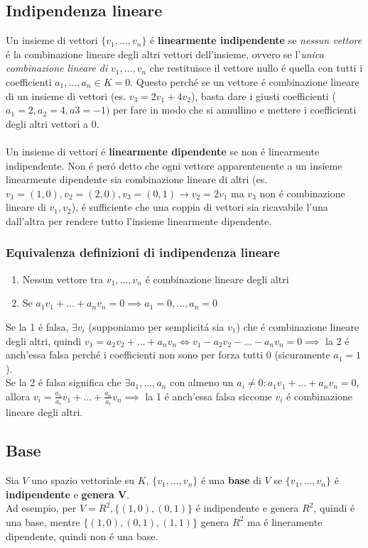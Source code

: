 \documentclass{article}
\begin{document}
\subsection{Indipendenza lineare}
Un insieme di vettori $\{v_1, \dots, v_n\}$ é \textbf{linearmente indipendente} se \textit{nessun vettore} é la combinazione lineare degli altri vettori dell'insieme, ovvero se l'\textit{unica combinazione lineare di} $v_1, \dots, v_n$ che restituisce il vettore nullo é quella con tutti i coefficienti $a_1, \dots, a_n \in K = 0$. Questo perché se un vettore é combinazione lineare di un insieme di vettori (es. $v_3 = 2v_1 + 4v_2$), basta dare i giusti coefficienti ($a_1=2, a_2=4, a3=-1)$ per fare in modo che si annullino e mettere i coefficienti degli altri vettori a 0.\\\\
Un insieme di vettori é \textbf{linearmente dipendente} se non é linearmente indipendente. Non é peró detto che ogni vettore apparentenente a un insieme linearmente dipendente sia combinazione lineare di altri (es. $v_1 = (1,0), v_2 = (2,0), v_3 = (0,1) \rightarrow v_2=2v_1$ ma $v_3$ non é combinazione lineare di $v_1, v_2$), é sufficiente che una coppia di vettori sia ricavabile l'una dall'altra per rendere tutto l'insieme linearmente dipendente.

\subsubsection{Equivalenza definizioni di indipendenza lineare}
\begin{enumerate}
	\item Nessun vettore tra $v_1, \dots, v_n$ é combinazione lineare degli altri
	\item Se $a_1v_1 + \dots + a_nv_n = 0 \implies a_1=0, \dots,a_n=0$
\end{enumerate}
Se la 1 é falsa, $\exists v_i$ (supponiamo per semplicitá sia $v_1$) che é combinazione lineare degli altri, quindi $v_1 = a_2v_2 + \dots + a_nv_n \iff v_1 - a_2v_2 - \dots - a_nv_n = 0 \implies$ la 2 é anch'essa falsa perché i coefficienti non sono per forza tutti 0 (sicuramente $a_1=1$).\\
Se la 2 é falsa significa che $\exists a_1, \dots, a_n$ con almeno un $a_i \ne 0 : a_1v_1 + \dots + a_nv_n = 0$, allora $\displaystyle v_i = \frac{a_1}{a_i}v_1 + \dots + \frac{a_n}{a_i}v_n \implies$ la 1 é anch'essa falsa siccome $v_i$ é combinazione lineare degli altri.

\subsection{Base}
Sia $V$ uno spazio vettoriale su $K$, $\{v_1, \dots, v_n\}$ é una \textbf{base} di $V$ se $\{v_1, \dots, v_n\}$ é \textbf{indipendente} e \textbf{genera V}.\\
Ad esempio, per $V=R^2, \{(1,0),(0,1)\}$ é indipendente e genera $R^2$, quindi é una base, mentre $\{(1,0), (0,1), (1,1)\}$ genera $R^2$ ma é lineramente dipendente, quindi non é una base.
\end{document}
